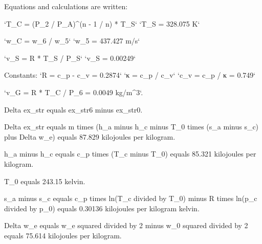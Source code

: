 Equations and calculations are written:  

`T_C = (P_2 / P_A)^(n - 1 / n) * T_S`  
`T_S = 328.075 K`  

`w_C = w_6 / w_5`  
`w_5 = 437.427 m/s`  

`v_S = R * T_S / P_S`  
`v_S = 0.00249`  

Constants:  
`R = c_p - c_v = 0.2874`  
`κ = c_p / c_v`  
`c_v = c_p / κ = 0.749`  

`v_G = R * T_C / P_6 = 0.0049 kg/m^3`.

Delta ex_str equals ex_str6 minus ex_str0.  

Delta ex_str equals m times (h_a minus h_c minus T_0 times (s_a minus s_c) plus Delta w_e) equals 87.829 kilojoules per kilogram.  

h_a minus h_c equals c_p times (T_c minus T_0) equals 85.321 kilojoules per kilogram.  

T_0 equals 243.15 kelvin.  

s_a minus s_c equals c_p times ln(T_c divided by T_0) minus R times ln(p_c divided by p_0) equals 0.30136 kilojoules per kilogram kelvin.  

Delta w_e equals w_e squared divided by 2 minus w_0 squared divided by 2 equals 75.614 kilojoules per kilogram.